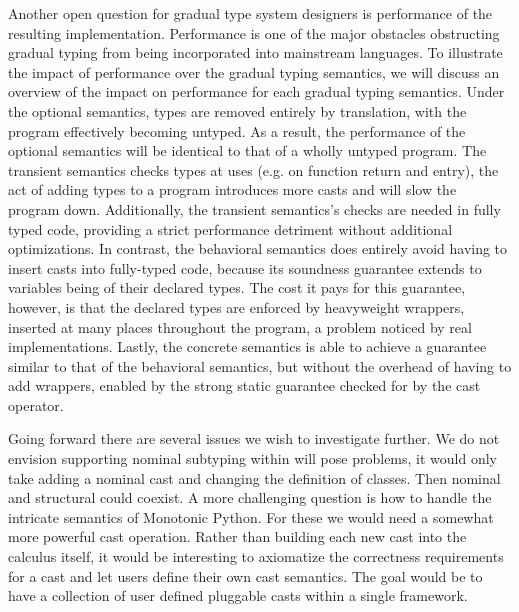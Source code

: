 \documentclass[a4paper,USenglish]{tex/lipics-v2016}
\begin{document}
Another open question for gradual type system designers is performance of
the resulting implementation. Performance is one of the major obstacles
obstructing gradual typing from being incorporated into mainstream
languages. To illustrate the impact of performance over the gradual typing
semantics, we will discuss an overview of the impact on performance for each
gradual typing semantics.  Under the optional semantics, types are removed
entirely by translation, with the program effectively becoming untyped. As a
result, the performance of the optional semantics will be identical to that
of a wholly untyped program.  The transient semantics checks types at uses
(e.g. on function return and entry), the act of adding types to a program
introduces more casts and will slow the program down. Additionally, the
transient semantics's checks are needed in fully typed code, providing a
strict performance detriment without additional optimizations.  In contrast,
the behavioral semantics does entirely avoid having to insert casts into
fully-typed code, because its soundness guarantee extends to variables being
of their declared types. The cost it pays for this guarantee, however, is
that the declared types are enforced by heavyweight wrappers, inserted at
many places throughout the program, a problem noticed by real
implementations.  Lastly, the concrete semantics is able to achieve a
guarantee similar to that of the behavioral semantics, but without the
overhead of having to add wrappers, enabled by the strong static guarantee
checked for by the cast operator.

Going forward there are several issues we wish to investigate further.  We
do not envision supporting nominal subtyping within \kafka will pose
problems, it would only take adding a nominal cast and changing the
definition of classes. Then nominal and structural could coexist. A more
challenging question is how to handle the intricate semantics of Monotonic
Python. For these we would need a somewhat more powerful cast operation.
Rather than building each new cast into the calculus itself, it would be
interesting to axiomatize the correctness requirements for a cast and let
users define their own cast semantics. The goal would be to have a collection
of user defined pluggable casts within a single framework.



\newpage
\appendix
\end{document}
